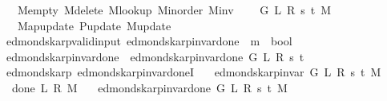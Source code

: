 \begin{isabellebody}
\ \ \ \ M{\isacharunderscore}{\kern0pt}empty\ M{\isacharunderscore}{\kern0pt}delete\ M{\isacharunderscore}{\kern0pt}lookup\ M{\isacharunderscore}{\kern0pt}inorder\ M{\isacharunderscore}{\kern0pt}inv\isanewline
\ \ \ \ G\ L\ R\ s\ t\ M\isanewline
\ \ \ \ Map{\isacharunderscore}{\kern0pt}update\ P{\isacharunderscore}{\kern0pt}update\ M{\isacharunderscore}{\kern0pt}update{\isachardoublequoteclose}\isanewline
\isanewline
{}\isamarkupfalse%
\ {\isacharparenleft}{\kern0pt}\ edmonds{\isacharunderscore}{\kern0pt}karp{\isacharunderscore}{\kern0pt}valid{\isacharunderscore}{\kern0pt}input{\isacharparenright}{\kern0pt}\ edmonds{\isacharunderscore}{\kern0pt}karp{\isacharunderscore}{\kern0pt}invar{\isacharunderscore}{\kern0pt}done{\isacharunderscore}{\kern0pt}{}{\isacharprime}{\kern0pt}{\isacharprime}{\kern0pt}\ {\isacharcolon}{\kern0pt}{\isacharcolon}{\kern0pt}\ {\isachardoublequoteopen}{\isacharprime}{\kern0pt}m\ {\isasymRightarrow}\ bool{\isachardoublequoteclose}\ \isanewline
\ \ {\isachardoublequoteopen}edmonds{\isacharunderscore}{\kern0pt}karp{\isacharunderscore}{\kern0pt}invar{\isacharunderscore}{\kern0pt}done{\isacharunderscore}{\kern0pt}{}{\isacharprime}{\kern0pt}{\isacharprime}{\kern0pt}\ {\isasymequiv}\ edmonds{\isacharunderscore}{\kern0pt}karp{\isacharunderscore}{\kern0pt}invar{\isacharunderscore}{\kern0pt}done{\isacharunderscore}{\kern0pt}{}{\isacharprime}{\kern0pt}\ G\ L\ R\ s\ t{\isachardoublequoteclose}\isanewline
\isanewline
{}\isamarkupfalse%
\ {\isacharparenleft}{\kern0pt}\ edmonds{\isacharunderscore}{\kern0pt}karp{\isacharparenright}{\kern0pt}\ edmonds{\isacharunderscore}{\kern0pt}karp{\isacharunderscore}{\kern0pt}invar{\isacharunderscore}{\kern0pt}done{\isacharunderscore}{\kern0pt}{}I{\isacharcolon}{\kern0pt}\isanewline
\ \ \ {\isachardoublequoteopen}edmonds{\isacharunderscore}{\kern0pt}karp{\isacharunderscore}{\kern0pt}invar{\isacharprime}{\kern0pt}\ G\ L\ R\ s\ t\ M{\isachardoublequoteclose}\isanewline
\ \ \ {\isachardoublequoteopen}done{\isacharunderscore}{\kern0pt}{}\ L\ R\ M{\isachardoublequoteclose}\isanewline
\ \ \ {\isachardoublequoteopen}edmonds{\isacharunderscore}{\kern0pt}karp{\isacharunderscore}{\kern0pt}invar{\isacharunderscore}{\kern0pt}done{\isacharunderscore}{\kern0pt}{}{\isacharprime}{\kern0pt}\ G\ L\ R\ s\ t\ M{\isachardoublequoteclose}%
\endisataginvisible
{\isafoldinvisible}%
%
\isadeliminvisible
\isanewline
%
\endisadeliminvisible

\end{isabellebody}
